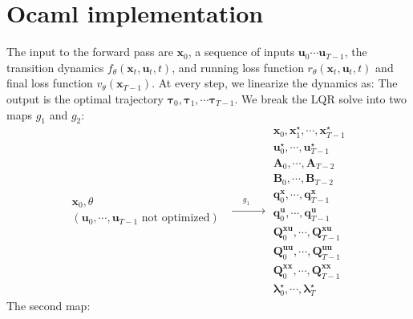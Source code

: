 \documentclass[a4paper,11pt]{article}
\renewcommand\b\bm
\newcommand\x{\b{x}}
\begin{document}
\section{Ocaml implementation}
The input to the forward pass are $\b{x}_0$, a sequence of inputs $\b{u}_0 \cdots \b{u}_{T-1}$, the transition dynamics $f_\theta(\b{x}_t, \b{u}_t, t)$, and running loss function $r_\theta(\b{x}_t, \b{u}_t, t)$ and final loss function $v_\theta(\b{x}_{T-1})$.
At every step, we linearize the dynamics as:
The output is the optimal trajectory $\b{\tau}_0, \b{\tau}_1, \cdots \b{\tau}_{T-1}$.
We break the LQR solve into two maps $g_1$ and $g_2$:
%
\begin{equation}
    \begin{aligned}
        \b{x}_0, \theta \\
        (\b{u}_0, \cdots, \b{u}_{T-1} \text{ not optimized})
    \end{aligned}
    \xrightarrow{\qquad g_1 \qquad}
    \begin{aligned}
        \b{x}_0, \b{x}^\star_1, \cdots, \b{x}^\star_{T-1} \\
        \b{u}^\star_0, \cdots, \b{u}^\star_{T-1}          \\
        \b{A}_{0}, \cdots, \b{A}_{T-2}                    \\
        \b{B}_{0}, \cdots, \b{B}_{T-2}                    \\
        \b{q}_{0}^{\x}, \cdots, \b{q}_{T-1}^{\b{x}}       \\
        \b{q}_{0}^{\b{u}}, \cdots, \b{q}_{T-1}^{\b{u}}    \\
        \b{Q}_{0}^{\b{xu}}, \cdots, \b{Q}_{T-1}^{\b{xu}}  \\
        \b{Q}_{0}^{\b{uu}}, \cdots, \b{Q}_{T-1}^{\b{uu}}  \\
        \b{Q}_{0}^{\b{xx}}, \cdots, \b{Q}_{T-1}^{\b{xx}}  \\
        \b{\lambda}_0^\star, \cdots, \b{\lambda}_T^\star
    \end{aligned}
\end{equation}
%
The second map:
%
\end{document}
